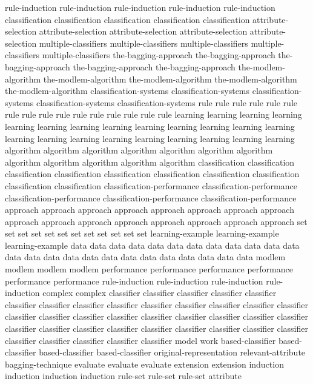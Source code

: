 rule-induction	rule-induction	rule-induction	rule-induction	rule-induction	
classification	classification	classification	classification	classification	
attribute-selection	attribute-selection	attribute-selection	attribute-selection	attribute-selection	
multiple-classifiers	multiple-classifiers	multiple-classifiers	multiple-classifiers	multiple-classifiers	
the-bagging-approach	the-bagging-approach	the-bagging-approach	the-bagging-approach	the-bagging-approach	
the-modlem-algorithm	the-modlem-algorithm	the-modlem-algorithm	the-modlem-algorithm	the-modlem-algorithm	
classification-systems	classification-systems	classification-systems	classification-systems	classification-systems	
rule	rule	rule	rule	rule	rule	rule	rule	rule	rule	rule	rule	rule	rule	rule	rule	
learning	learning	learning	learning	learning	learning	learning	learning	learning	learning	learning	learning	learning	learning	learning	learning	learning	learning	learning	learning	learning	learning	
algorithm	algorithm	algorithm	algorithm	algorithm	algorithm	algorithm	algorithm	algorithm	algorithm	algorithm	algorithm	
classification	classification	classification	classification	classification	classification	classification	classification	classification	classification	
classification-performance	classification-performance	classification-performance	classification-performance	classification-performance	
approach	approach	approach	approach	approach	approach	approach	approach	approach	approach	approach	approach	approach	approach	approach	approach	
set	set	set	set	set	set	set	set	set	set	set	set	
learning-example	learning-example	learning-example	
data	data	data	data	data	data	data	data	data	data	data	data	data	data	data	data	data	data	data	data	data	data	data	data	data	
modlem	modlem	modlem	modlem	
performance	performance	performance	performance	performance	performance	
rule-induction	rule-induction	rule-induction	rule-induction	
complex	complex	
classifier	classifier	classifier	classifier	classifier	classifier	classifier	classifier	classifier	classifier	classifier	classifier	classifier	classifier	classifier	classifier	classifier	classifier	classifier	classifier	classifier	classifier	classifier	classifier	classifier	classifier	classifier	classifier	classifier	classifier	classifier	classifier	classifier	classifier	classifier	classifier	classifier	
model	
work	
based-classifier	based-classifier	based-classifier	based-classifier	
original-representation	
relevant-attribute	
bagging-technique	
evaluate	evaluate	evaluate	
extension	extension	
induction	induction	induction	induction	
rule-set	rule-set	rule-set	
attribute	
